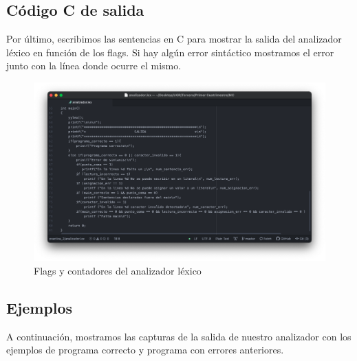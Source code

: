 \subsection{Código C de salida}

Por último, escribimos las sentencias en C para mostrar la salida del analizador léxico en función de los flags. Si hay algún error sintáctico mostramos el error junto con la línea donde ocurre el mismo.

\begin{figure}[H] 
	\centering
	\includegraphics[scale=0.38]{../practica_2/images/funciones_c.png} 
	\caption{Flags y contadores del analizador léxico} 
    \label{fig:funciones_c}
\end{figure}

\subsection{Ejemplos}

A continuación, mostramos las capturas de la salida de nuestro analizador con los ejemplos de programa correcto y programa con errores anteriores.

